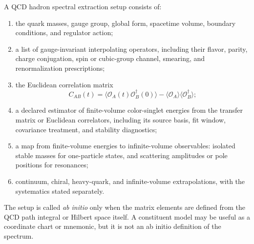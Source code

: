 \begin{definition}
\label{def:qcd-hadron-spectral-extraction-setup}
A QCD hadron spectral extraction setup consists of:
\begin{enumerate}
  \item the quark masses, gauge group, global form, spacetime volume, boundary
  conditions, and regulator action;
  \item a list of gauge-invariant interpolating operators, including their
  flavor, parity, charge conjugation, spin or cubic-group channel, smearing,
  and renormalization prescriptions;
  \item the Euclidean correlation matrix
  \[
    C_{AB}(t)=
    \langle \mathcal O_A(t)\mathcal O_B^\dagger(0)\rangle
    -\langle \mathcal O_A\rangle\langle\mathcal O_B^\dagger\rangle ;
  \]
  \item a declared estimator of finite-volume color-singlet energies from the
  transfer matrix or Euclidean correlators, including its source basis, fit
  window, covariance treatment, and stability diagnostics;
  \item a map from finite-volume energies to infinite-volume observables:
  isolated stable masses for one-particle states, and scattering amplitudes or
  pole positions for resonances;
  \item continuum, chiral, heavy-quark, and infinite-volume extrapolations,
  with the systematics stated separately.
\end{enumerate}
The setup is called \emph{ab initio} only when the matrix elements are defined
from the QCD path integral or Hilbert space itself.  A constituent model may
be useful as a coordinate chart or mnemonic, but it is not an ab initio
definition of the spectrum.
\end{definition}

